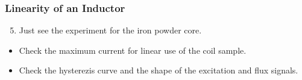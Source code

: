 \documentclass{beamer}
\begin{document}
	\begin{frame}
    \frametitle{Linearity of an Inductor}
		\begin{enumerate}
			\setcounter{enumi}{4}
			\item Just see the experiment for the iron powder core.
		\end{enumerate}
			\begin{itemize}
				\item Check the maximum current for linear use of the coil sample.
				\item Check the hysterezis curve and the shape of the excitation and flux signals.
			\end{itemize}
	\end{frame}
\end{document}
